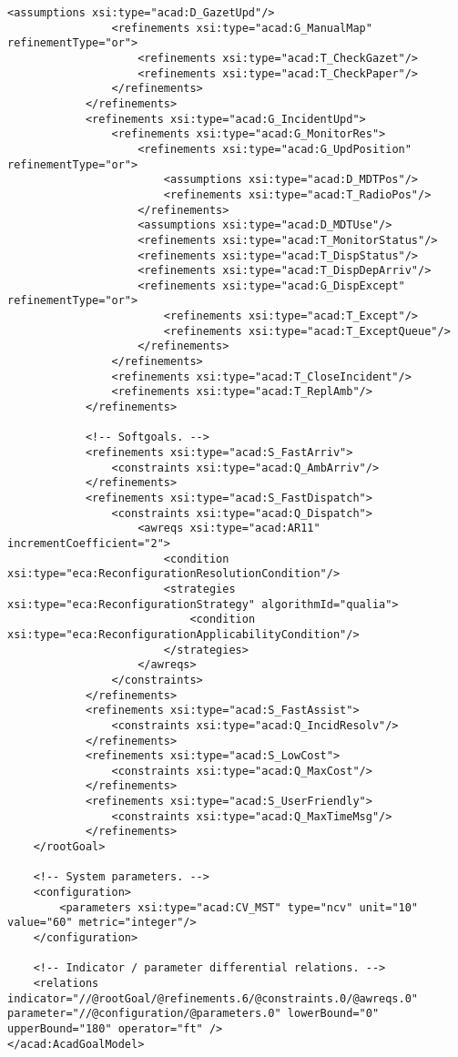 \begin{lstlisting}[caption={Especifcação do Sistema ACAD}]
				<assumptions xsi:type="acad:D_GazetUpd"/>
				<refinements xsi:type="acad:G_ManualMap" refinementType="or">
					<refinements xsi:type="acad:T_CheckGazet"/>
					<refinements xsi:type="acad:T_CheckPaper"/>
				</refinements>
			</refinements>
			<refinements xsi:type="acad:G_IncidentUpd">
				<refinements xsi:type="acad:G_MonitorRes">
					<refinements xsi:type="acad:G_UpdPosition" refinementType="or">
						<assumptions xsi:type="acad:D_MDTPos"/>
						<refinements xsi:type="acad:T_RadioPos"/>
					</refinements>
					<assumptions xsi:type="acad:D_MDTUse"/>
					<refinements xsi:type="acad:T_MonitorStatus"/>
					<refinements xsi:type="acad:T_DispStatus"/>
					<refinements xsi:type="acad:T_DispDepArriv"/>
					<refinements xsi:type="acad:G_DispExcept" refinementType="or">
						<refinements xsi:type="acad:T_Except"/>
						<refinements xsi:type="acad:T_ExceptQueue"/>
					</refinements>
				</refinements>
				<refinements xsi:type="acad:T_CloseIncident"/>
				<refinements xsi:type="acad:T_ReplAmb"/>
			</refinements>

			<!-- Softgoals. -->
			<refinements xsi:type="acad:S_FastArriv">
				<constraints xsi:type="acad:Q_AmbArriv"/>
			</refinements>
			<refinements xsi:type="acad:S_FastDispatch">
				<constraints xsi:type="acad:Q_Dispatch">
					<awreqs xsi:type="acad:AR11" incrementCoefficient="2">						
						<condition xsi:type="eca:ReconfigurationResolutionCondition"/>
						<strategies xsi:type="eca:ReconfigurationStrategy" algorithmId="qualia">
							<condition xsi:type="eca:ReconfigurationApplicabilityCondition"/>
						</strategies>
					</awreqs>
				</constraints>
			</refinements>
			<refinements xsi:type="acad:S_FastAssist">
				<constraints xsi:type="acad:Q_IncidResolv"/>
			</refinements>
			<refinements xsi:type="acad:S_LowCost">
				<constraints xsi:type="acad:Q_MaxCost"/>
			</refinements>
			<refinements xsi:type="acad:S_UserFriendly">
				<constraints xsi:type="acad:Q_MaxTimeMsg"/>
			</refinements>
	</rootGoal>

	<!-- System parameters. -->
	<configuration>
		<parameters xsi:type="acad:CV_MST" type="ncv" unit="10" value="60" metric="integer"/>
	</configuration>

	<!-- Indicator / parameter differential relations. -->
	<relations indicator="//@rootGoal/@refinements.6/@constraints.0/@awreqs.0" parameter="//@configuration/@parameters.0" lowerBound="0" upperBound="180" operator="ft" />
</acad:AcadGoalModel>

\end{lstlisting}
